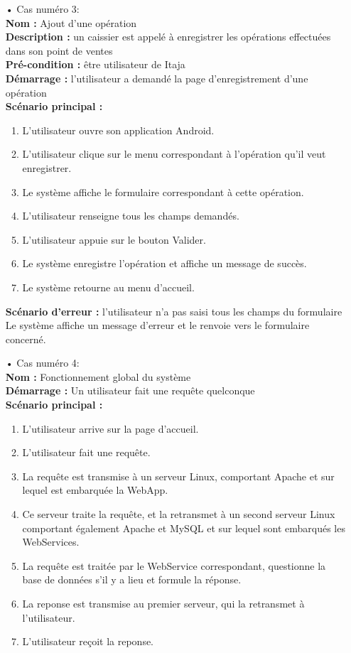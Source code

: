 \documentclass[12pt]{report}
\begin{document}
\begin{enumerate}
	     \item[•] Cas numéro 3:\\
	      \textbf{Nom :} Ajout d'une opération\\
		\textbf{Description :} un caissier est appelé à enregistrer les opérations effectuées dans son point de ventes\\ 
		\textbf{Pré-condition :} être utilisateur de Itaja\\
		\textbf{Démarrage :} l'utilisateur a demandé la page d'enregistrement d'une opération\\
		\textbf{Scénario principal :}
		\begin{enumerate}
		  \item L'utilisateur ouvre son application Android.
		  \item L'utilisateur clique sur le menu correspondant à l'opération qu'il veut enregistrer.
		  \item Le système affiche le formulaire correspondant à cette opération.
		  \item L'utilisateur renseigne tous les champs demandés.
		  \item L'utilisateur appuie sur le bouton Valider.
		  \item Le système enregistre l'opération et affiche un message de succès.
		  \item Le système retourne au menu d'accueil.
		\end{enumerate}
	      \textbf{Scénario d'erreur :} l'utilisateur n'a pas saisi tous les champs du formulaire\\
		Le système affiche un message d'erreur et le renvoie vers le formulaire concerné.
		
	     \item[•] Cas numéro 4:\\
	      \textbf{Nom :} Fonctionnement global du système\\
		\textbf{Démarrage :} Un utilisateur fait une requête quelconque\\
		\textbf{Scénario principal :}
		\begin{enumerate}
		  \item L'utilisateur arrive sur la page d'accueil.
		  \item L'utilisateur fait une requête.
		  \item La requête est transmise à un serveur Linux, comportant Apache et sur lequel est embarquée la WebApp.
		  \item Ce serveur traite la requête, et la retransmet à un second serveur Linux comportant également Apache et MySQL et sur lequel sont embarqués les WebServices.
		  \item La requête est traitée par le WebService correspondant, questionne la base de données s'il y a lieu et formule la réponse.
		  \item La reponse est transmise au premier serveur, qui la retransmet à l'utilisateur.
		  \item L'utilisateur reçoit la reponse.
		\end{enumerate}
	   \end{enumerate}
      
\end{document}
